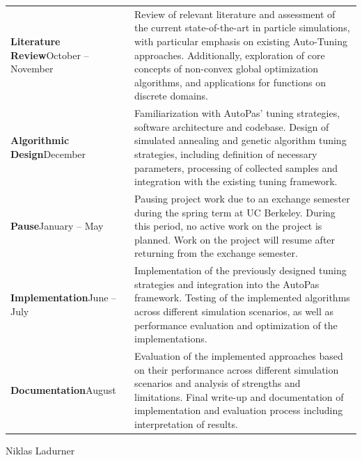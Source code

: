 \documentclass[11pt,parskip=full+]{scrartcl}
\begin{document}
\begin{table}[htpb]
	\noindent
	\begin{tabularx}{\textwidth}{@{}p{3.5cm} X@{}}
		\textbf{\textsf{Literature Review}}\newline October -- November & Review of relevant literature and assessment of the current state-of-the-art in particle simulations, with particular emphasis on existing Auto-Tuning approaches. Additionally, exploration of core concepts of non-convex global optimization algorithms, and applications for functions on discrete domains. \\
		\textbf{\textsf{Algorithmic Design}}\newline December & Familiarization with AutoPas' tuning strategies, software architecture and codebase. Design of simulated annealing and genetic algorithm tuning strategies, including definition of necessary parameters, processing of collected samples and integration with the existing tuning framework. \\
		\textbf{\textsf{Pause}}\newline January -- May & Pausing project work due to an exchange semester during the spring term at UC Berkeley. During this period, no active work on the project is planned. Work on the project will resume after returning from the exchange semester. \\
		\textbf{\textsf{Implementation}}\newline June -- July & Implementation of the previously designed tuning strategies and integration into the AutoPas framework. Testing of the implemented algorithms across different simulation scenarios, as well as performance evaluation and optimization of the implementations. \\
		\textbf{\textsf{Documentation}}\newline August & Evaluation of the implemented approaches based on their performance across different simulation scenarios and analysis of strengths and limitations. Final write-up and documentation of implementation and evaluation process including interpretation of results. \\
	\end{tabularx}
\end{table}

\vfill
Niklas Ladurner\hfill \thedate\\[-\baselineskip]

\printbibliography
\end{document}
